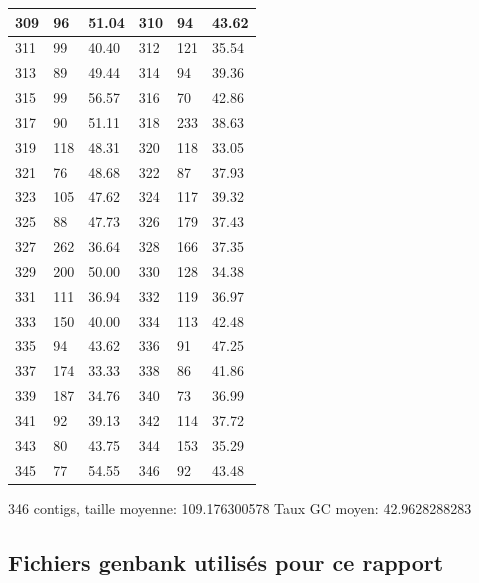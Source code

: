 \documentclass[10.9pt]{article} %
\begin{document}
{\begin{longtable}{|p{2cm}|p{2cm}|p{2cm}|p{2cm}|p{2cm}|p{2cm}|}
\hline
309 & 96& 51.04 & 310 & 94& 43.62\\
\hline
311 & 99& 40.40 & 312 & 121& 35.54\\
\hline
313 & 89& 49.44 & 314 & 94& 39.36\\
\hline
315 & 99& 56.57 & 316 & 70& 42.86\\
\hline
317 & 90& 51.11 & 318 & 233& 38.63\\
\hline
319 & 118& 48.31 & 320 & 118& 33.05\\
\hline
321 & 76& 48.68 & 322 & 87& 37.93\\
\hline
323 & 105& 47.62 & 324 & 117& 39.32\\
\hline
325 & 88& 47.73 & 326 & 179& 37.43\\
\hline
327 & 262& 36.64 & 328 & 166& 37.35\\
\hline
329 & 200& 50.00 & 330 & 128& 34.38\\
\hline
331 & 111& 36.94 & 332 & 119& 36.97\\
\hline
333 & 150& 40.00 & 334 & 113& 42.48\\
\hline
335 & 94& 43.62 & 336 & 91& 47.25\\
\hline
337 & 174& 33.33 & 338 & 86& 41.86\\
\hline
339 & 187& 34.76 & 340 & 73& 36.99\\
\hline
341 & 92& 39.13 & 342 & 114& 37.72\\
\hline
343 & 80& 43.75 & 344 & 153& 35.29\\
\hline
345 & 77& 54.55 & 346 & 92& 43.48\\
\hline
\end{longtable}
}
346 contigs, taille moyenne: 109.176300578 Taux GC moyen: 42.9628288283


\subsection{Fichiers genbank utilisés pour ce rapport}\label{26}
\end{document}

